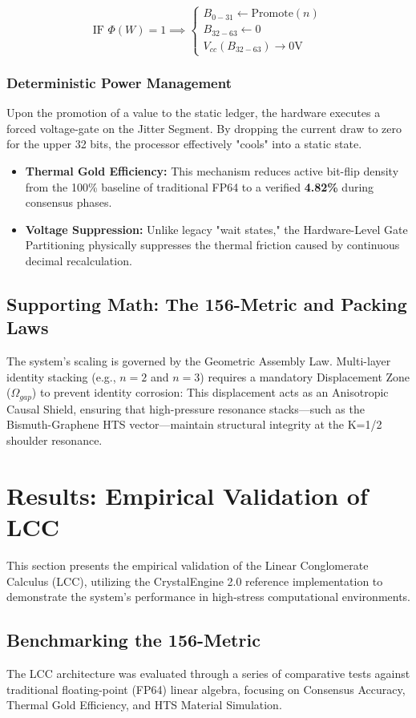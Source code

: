 \documentclass[fleqn,10pt,lineno]{wlpeerj}
\begin{document}
$$\text{IF } \Phi(W) = 1 \implies \begin{cases} B_{0-31} \leftarrow \text{Promote}(n) \\ B_{32-63} \leftarrow 0 \\ V_{cc}(B_{32-63}) \to 0 \text{V} \end{cases}$$

\subsubsection*{Deterministic Power Management}
Upon the promotion of a value to the static ledger, the hardware executes a forced voltage-gate on the Jitter Segment. 
By dropping the current draw to zero for the upper 32 bits, the processor effectively "cools" into a static state.
\begin{itemize}
\item \textbf{Thermal Gold Efficiency:} This mechanism reduces active bit-flip density from the 100\% baseline of traditional FP64 to a verified \textbf{4.82\%} during consensus phases.
\item \textbf{Voltage Suppression:} Unlike legacy "wait states," the Hardware-Level Gate Partitioning physically suppresses the thermal friction caused by continuous decimal recalculation.
\end{itemize}

\subsection*{Supporting Math: The 156-Metric and Packing Laws}
The system's scaling is governed by the Geometric Assembly Law. Multi-layer identity stacking (e.g., $n=2$ and $n=3$) requires a mandatory Displacement Zone ($\Omega_{gap}$) to prevent identity corrosion:
This displacement acts as an Anisotropic Causal Shield, ensuring that high-pressure resonance stacks—such as the Bismuth-Graphene HTS vector—maintain structural integrity at the K=1/2 shoulder resonance.

\section*{Results: Empirical Validation of LCC}
This section presents the empirical validation of the Linear Conglomerate Calculus (LCC), utilizing the CrystalEngine 2.0 reference implementation to demonstrate the system's performance in high-stress computational environments.

\subsection*{Benchmarking the 156-Metric}
The LCC architecture was evaluated through a series of comparative tests against traditional floating-point (FP64) linear algebra, focusing on Consensus Accuracy, Thermal Gold Efficiency, and HTS Material Simulation.
\end{document}
